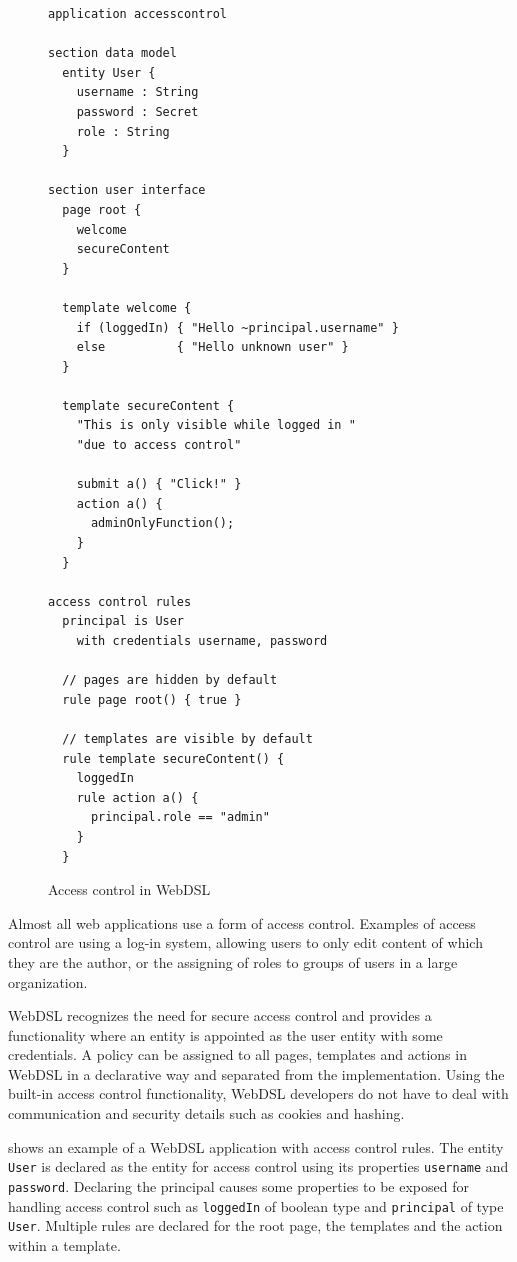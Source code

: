     \begin{figure}
      \capstart
      \begin{verbatim}
application accesscontrol

section data model
  entity User {
    username : String
    password : Secret
    role : String
  }

section user interface
  page root {
    welcome
    secureContent
  }

  template welcome {
    if (loggedIn) { "Hello ~principal.username" }
    else          { "Hello unknown user" }
  }

  template secureContent {
    "This is only visible while logged in "
    "due to access control"

    submit a() { "Click!" }
    action a() {
      adminOnlyFunction();
    }
  }

access control rules
  principal is User 
    with credentials username, password

  // pages are hidden by default
  rule page root() { true }

  // templates are visible by default
  rule template secureContent() {
    loggedIn
    rule action a() {
      principal.role == "admin"
    }
  }
      \end{verbatim}
      \caption{\label{fig:webdsl-access-control}Access control in WebDSL}
    \end{figure}

    Almost all web applications use a form of access control. Examples of access control are using a log-in system, allowing users to only edit content of which they are the author, or the assigning of roles to groups of users in a large organization.

    WebDSL recognizes the need for secure access control and provides a functionality where an entity is appointed as the user entity with some credentials. A policy can be assigned to all pages, templates and actions in WebDSL in a declarative way and separated from the implementation. Using the built-in access control functionality, WebDSL developers do not have to deal with communication and security details such as cookies and hashing.

     shows an example of a WebDSL application with access control rules. The entity \texttt{User} is declared as the entity for access control using its properties \texttt{username} and \texttt{password}. Declaring the principal causes some properties to be exposed for handling access control such as \texttt{loggedIn} of boolean type and \texttt{principal} of type \texttt{User}. Multiple rules are declared for the root page, the templates and the action within a template.


